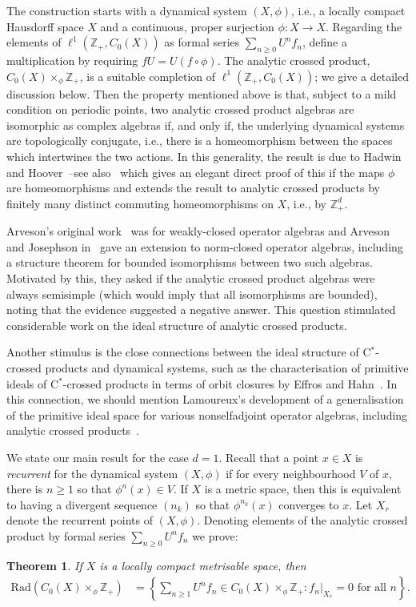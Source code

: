 \documentclass[12pt]{amsart}
\newtheorem{theorem}{Theorem}
\theoremstyle{definition}
\newcommand{\bbZ}{\mathbb{Z}}
\newcommand{\rad}{\mathrm{Rad}}
\newcommand{\cstar}{C$^*$}
\begin{document}
The construction starts with a dynamical system $(X,\phi)$,
i.e., a locally compact Hausdorff space $X$ and a continuous, proper
surjection $\phi : X \to X$.
Regarding the elements of $\ell^1(\bbZ_+,C_0(X))$ as formal series
$\sum_{n \ge 0} U^n f_n$, define a multiplication by requiring
$f U = U (f\circ\phi)$.
The analytic crossed product, $C_0(X) \times_\phi \bbZ_+$,
is a suitable completion of $\ell^1(\bbZ_+,C_0(X))$; we give a
detailed discussion below.
Then the property mentioned above is that, subject to a mild
condition on periodic points, two analytic crossed product
algebras are isomorphic as complex algebras if, and only if,
the underlying dynamical systems are topologically conjugate,
i.e., there is a homeomorphism between the spaces which intertwines
the two actions.
In this generality, the result is due to Hadwin and
Hoover~\cite{HadHoo88,HadHoo89}--see also~\cite{Pow92b} which
gives an elegant direct proof of this if the maps $\phi$ are
homeomorphisms and extends the result to analytic crossed products
by finitely many distinct commuting homeomorphisms on $X$,
i.e., by $\bbZ_+^d$.

Arveson's original work~\cite{Arv67a} was for weakly-closed operator
algebras and Arveson and Josephson in~\cite{ArvJos69} gave an
extension to norm-closed operator algebras, including a structure
theorem for bounded isomorphisms between two such algebras.
Motivated by this, they asked if the analytic crossed product algebras
were always semisimple (which would imply that all isomorphisms
are bounded), noting that the evidence suggested a negative answer.
This question stimulated considerable work on the ideal structure of
analytic crossed products.

Another stimulus is the close connections between the ideal
structure of \cstar-crossed products and dynamical systems, such
as the characterisation of primitive ideals of \cstar-crossed
products in terms of orbit closures by Effros and
Hahn~\cite{EffrosHah67}. In this connection, we should mention
Lamoureux's development of a generalisation of the primitive ideal
space for various nonselfadjoint operator algebras, including
analytic crossed products~\cite{Lam93,Lam96a}.

We state our main result for the case $d=1$. Recall that a point
$x \in X$ is \emph{recurrent} for the dynamical system $(X,\phi)$
if for every neighbourhood $V$ of $x$, there is $n \ge 1$ so that
$\phi^n(x) \in V$. If $X$ is a metric space, then this is
equivalent to having a divergent sequence $(n_k)$ so
that $\phi^{n_k}(x)$ converges to $x$. Let $X_r$ denote the
recurrent points of $(X,\phi)$. Denoting elements of the analytic
crossed product by formal series $\sum_{n\ge 0} U^n f_n$ we prove:
\begin{theorem}
\label{fulrad} If $X$ is a locally compact metrisable space, then
\begin{align*}
\rad( C_0(X)\times_\phi\bbZ_+)
    &= \left\{ \sum_{n \ge 1} U^n f_n \in C_0(X)\times_\phi\bbZ_+:
     f_n |_{X_r}=0\text{ for all }n \right\}. \\
\end{align*}
\end{theorem}
\end{document}
